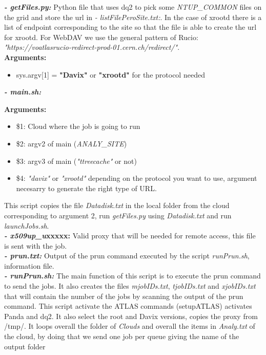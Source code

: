 \noindent \textbf{\textit{- getFiles.py:}} Python file that uses dq2 to pick some \textit{NTUP\_COMMON} files on the grid and store the url in \textit{- listFilePeroSite.txt:}. In the case of xrootd there is a list of endpoint corresponding to the site so that the file is able to create the url for xrootd. For WebDAV we use the general pattern of Rucio: \textit{"https://voatlasrucio-redirect-prod-01.cern.ch/redirect/"}.\\
\textbf{Arguments:}\\
\begin{itemize}
	\item sys.argv[1] = \textbf{"Davix"} or \textbf{"xrootd"} for the protocol needed
\end{itemize}

\noindent \textbf{\textit{- main.sh:}}

\textbf{Arguments:}\\
\begin{itemize}
	\item \$1: Cloud where the job is going to run
	\item \$2: argv2 of main (\textit{ANALY\_SITE})
	\item \$3: argv3 of main (\textit{"ttreecache"} or not)
	\item \$4: \textit{"davix"} or \textit{"xrootd"} depending on the protocol you want to use, argument necesarry to generate the right type of URL.
\end{itemize}

This script copies the file \textit{Datadisk.txt} in the local folder from the cloud corresponding to argument 2, run \textit{getFiles.py} using \textit{Datadisk.txt} and run \textit{launchJobs.sh}.\\

\noindent \textbf{\textit{- x509up\_u}xxxxx:} Valid proxy that will be needed for remote access, this file is sent with the job.\\

\noindent \textbf{\textit{- prun.txt:}} Output of the prun command executed by the script \textit{runPrun.sh}, information file.\\

\noindent \textbf{\textit{- runPrun.sh:}} The main function of this script is to execute the prun command to send the jobs. It also creates the files \textit{mjobIDs.txt}, \textit{tjobIDs.txt} and \textit{xjobIDs.txt} that will contain the number of the jobs by scanning the output of the prun command. This script activate the ATLAS commands (setupATLAS) activates Panda and dq2. It also select the root and Davix versions, copies the proxy from /tmp/.
It loops overall the folder of \textit{Clouds} and overall the items in \textit{Analy.txt} of the cloud, by doing that we send one job per queue giving the name of the output folder\\

